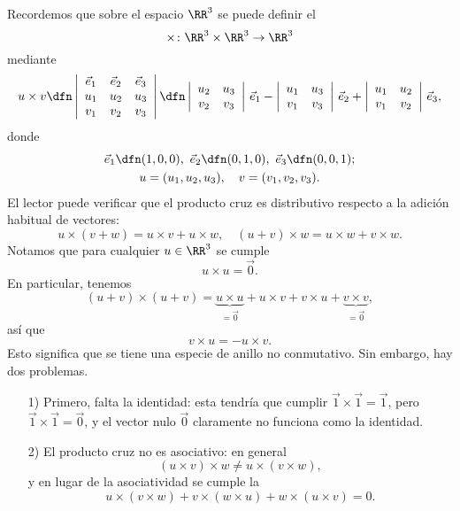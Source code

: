 \begin{ejemplo}
  Recordemos que sobre el espacio $\RR^3$ se puede definir el
  $$\times\colon \RR^3\times \RR^3 \to \RR^3$$
  mediante
  \[ u \times v \dfn
    \left|\begin{array}{ccc}
            \vec{e}_1 & \vec{e}_2 & \vec{e}_3 \\
            u_1 & u_2 & u_3 \\
            v_1 & v_2 & v_3\end{array}\right| \dfn
     \left|\begin{array}{cc}
             u_2 & u_3 \\
             v_2 & v_3
           \end{array}\right|\,\vec{e}_1
     - \left|\begin{array}{cc}
                      u_1 & u_3 \\
                      v_1 & v_3
                \end{array}\right|\,\vec{e}_2
      + \left|\begin{array}{cc}
                u_1 & u_2 \\
                v_1 & v_2
              \end{array}\right|\,\vec{e}_3, \]
  donde
  \begin{gather*}
    \vec{e}_1 \dfn (1,0,0), ~
    \vec{e}_2 \dfn (0,1,0), ~
    \vec{e}_3 \dfn (0,0,1);\\
    u = (u_1, u_2, u_3), \quad
    v = (v_1, v_2, v_3).
  \end{gather*}
  El lector puede verificar que el producto cruz es distributivo respecto a la
  adición habitual de vectores:
  \[ u\times (v + w) = u\times v + u\times w, \quad
    (u + v)\times w = u\times w + v\times w. \]
  Notamos que para cualquier $u \in \RR^3$ se cumple
  $$u \times u = \vec{0}.$$
  En particular, tenemos
  $$(u + v) \times (u + v) = \underbrace{u\times u}_{=\vec{0}} + u\times v + v\times u + \underbrace{v\times v}_{=\vec{0}},$$
  así que
  $$v\times u = -u\times v.$$
  Esto significa que se tiene una especie de anillo no conmutativo. Sin embargo,
  hay dos problemas.

  \begin{itemize}
  \item[1)] Primero, falta la identidad: esta tendría que cumplir
    $\vec{1}\times\vec{1} = \vec{1}$, pero $\vec{1}\times\vec{1} = \vec{0}$, y
    el vector nulo $\vec{0}$ claramente no funciona como la identidad.

  \item[2)] El producto cruz no es asociativo: en general
    $$(u\times v)\times w \ne u\times (v\times w),$$
    y en lugar de la asociatividad se cumple la 
    $$u \times (v \times w) + v \times (w \times u) + w \times (u \times  v) = 0.$$


\end{itemize}
\end{ejemplo}
